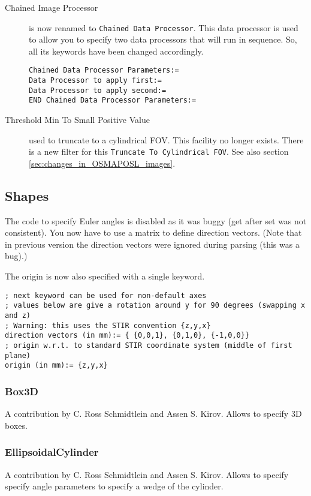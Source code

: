 \documentclass{article}
\begin{document}
\begin{description}
\item[Chained Image Processor]
is now renamed to \texttt{Chained Data Processor}. 
This data processor is used to allow you to specify two
data processors that will run in sequence. So, all its keywords have
been changed accordingly.
\begin{verbatim}
Chained Data Processor Parameters:=
Data Processor to apply first:= 
Data Processor to apply second:=
END Chained Data Processor Parameters:=
\end{verbatim}

\item[Threshold Min To Small Positive Value]
used to truncate to a cylindrical FOV. This facility no longer
exists. There is a new filter for this \texttt{Truncate To Cylindrical FOV}.
See also section \ref{sec:changes_in_OSMAPOSL_images}.
\end{description}


\subsection{Shapes}
The code to specify Euler angles is disabled
as it was buggy (get after set was not consistent).
You now have to  use a matrix to define direction vectors. 
(Note that in previous version the direction
vectors were ignored during parsing (this was a bug).)

The origin is now also specified with a single keyword.
\begin{verbatim}
; next keyword can be used for non-default axes
; values below are give a rotation around y for 90 degrees (swapping x and z)
; Warning: this uses the STIR convention {z,y,x}
direction vectors (in mm):= { {0,0,1}, {0,1,0}, {-1,0,0}}
; origin w.r.t. to standard STIR coordinate system (middle of first plane)
origin (in mm):= {z,y,x}
\end{verbatim}

\subsubsection{Box3D}
A contribution by C. Ross Schmidtlein and Assen S. Kirov. Allows
to specify 3D boxes.

\subsubsection{EllipsoidalCylinder}
A contribution by C. Ross Schmidtlein and Assen S. Kirov. Allows
to specify specify angle parameters to specify a wedge of the
cylinder.
\end{document}
